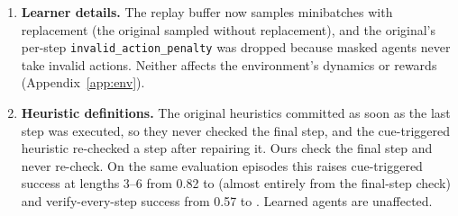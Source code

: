 \begin{enumerate}
  \item \textbf{Learner details.} The replay buffer now samples minibatches with replacement (the original sampled without replacement), and the original's per-step \texttt{invalid\_action\_penalty} was dropped because masked agents never take invalid actions. Neither affects the environment's dynamics or rewards (Appendix~\ref{app:env}).
  \item \textbf{Heuristic definitions.} The original heuristics committed as soon as the last step was executed, so they never checked the final step, and the cue-triggered heuristic re-checked a step after repairing it. Ours check the final step and never re-check. On the same evaluation episodes this raises cue-triggered success at lengths 3--6 from 0.82 to  (almost entirely from the final-step check) and verify-every-step success from 0.57 to . Learned agents are unaffected.
\end{enumerate}
